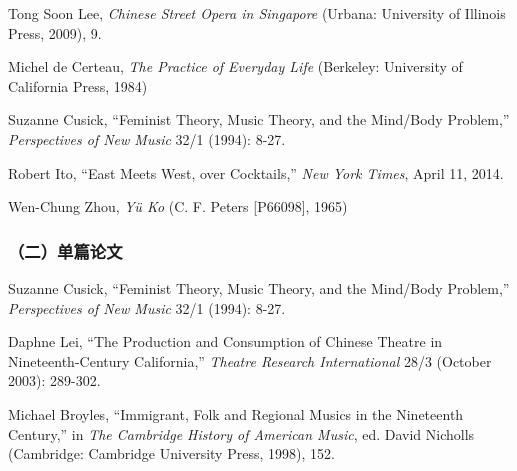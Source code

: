 \begin{achievements}
\item Tong Soon Lee, \textit{Chinese Street Opera in Singapore} (Urbana: University of Illinois Press, 2009), 9.
\item Michel de Certeau, \textit{The Practice of Everyday Life} (Berkeley: University of California Press, 1984)
\item Suzanne Cusick, “Feminist Theory, Music Theory, and the Mind/Body Problem,” \textit{Perspectives of New Music} 32/1 (1994): 8-27.
\item Robert Ito, “East Meets West, over Cocktails,” \textit{New York Times}, April 11, 2014.
\item Wen-Chung Zhou, \textit{Yü Ko} (C. F. Peters [P66098], 1965)
\end{achievements}

\subsubsection*{（二）单篇论文}

\begin{achievements}
\item Suzanne Cusick, “Feminist Theory, Music Theory, and the Mind/Body Problem,” \textit{Perspectives of New Music} 32/1 (1994): 8-27.
\item Daphne Lei, “The Production and Consumption of Chinese Theatre in Nineteenth-Century California,” \textit{Theatre Research International }28/3 (October 2003): 289-302.
\item Michael Broyles, “Immigrant, Folk and Regional Musics in the Nineteenth Century,” in \textit{The Cambridge History of American Music}, ed. David Nicholls (Cambridge: Cambridge University Press, 1998), 152.

\end{achievements}